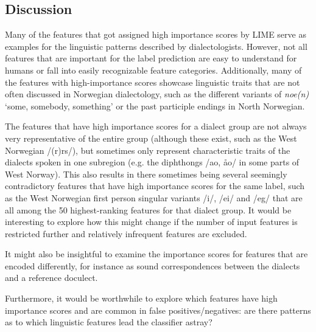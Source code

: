 \subsection{Discussion}
\label{sec:dialects-discussion}

Many of the features that got assigned high importance scores by LIME serve as examples for the linguistic patterns described by dialectologists.
However, not all features that are important for the label prediction are easy to understand for humans or fall into easily recognizable feature categories.
Additionally, many of the features with high-importance scores showcase linguistic traits that are not often discussed in Norwegian dialectology, such as the different variants of \textit{noe(n)} `some, somebody, something' or the past participle endings in North Norwegian.

The features that have high importance scores for a dialect group are not always very representative of the entire group (although these exist, such as the West Norwegian /(r)rs/), but sometimes only represent characteristic traits of the dialects spoken in one subregion (e.g. the diphthongs /ao, \aa{}o/ in some parts of West Norway).
This also results in there sometimes being several seemingly contradictory features that have high importance scores for the same label, such as the West Norwegian first person singular variants /i/, /ei/ and /eg/ that are all among the 50 highest-ranking features for that dialect group.
It would be interesting to explore how this might change if the number of input features is restricted further and relatively infrequent features are excluded.

It might also be insightful to examine the importance scores for features that are encoded differently, for instance as sound correspondences between the dialects and a reference doculect.

Furthermore, it would be worthwhile to explore which features have high importance scores and are common in false positives/negatives: are there patterns as to which linguistic features lead the classifier astray?
